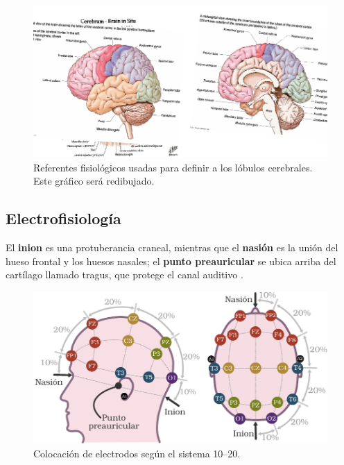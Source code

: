 \begin{figure}
\centering
\includegraphics[width=0.8\linewidth]{./img_diagramas/cerebro_zonas.pdf} 
\caption{Referentes fisiológicos usadas para definir a los lóbulos cerebrales. 
Este gráfico será redibujado.
}
\label{lobulos}
\end{figure}


\subsection{Electrofisiología}

El \textbf{inion} es una protuberancia craneal, mientras que el \textbf{nasión} es la unión del 
hueso frontal y los huesos nasales; el \textbf{punto preauricular} se ubica arriba del cartílago 
llamado tragus, que protege el canal auditivo \cite{Butkov07}. 

\begin{figure}
\centering
\includegraphics[width=\linewidth]{./img_diagramas/cabeza_proporcionada_color.pdf} 
\caption{Colocación de electrodos según el sistema 10--20.
}
\label{img1020}
\end{figure}

